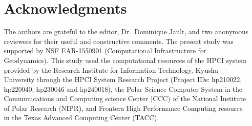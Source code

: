 \section*{Acknowledgments}
{\color{teal}
The authors are grateful to the editor, Dr.\ Dominique Jault, and two anonymous reviewers for their useful and constructive comments.
}
The present study was supported by NSF EAR-1550901 (Computational Infrastructure for Geodynamics).
This study used the computational resources of the HPCI system provided by the Research Institute for Information Technology, Kyushu University through the HPCI System Research Project (Project IDs: hp210022, hp220040, hp230046 and hp240018), the Polar Science Computer System in the Communications and Computing science Center (CCC) of the National Institute of Polar Research (NIPR), and Frontera High Performance Computing resource in the Texas Advanced Computing Center (TACC). 

